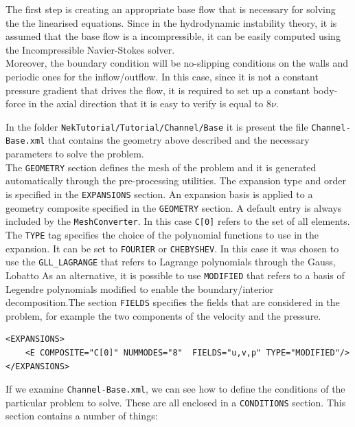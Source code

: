 \documentclass[a4paper,12pt]{article}
\begin{document}
The first step is creating an appropriate base flow that is necessary for solving the the linearised equations. Since in the hydrodynamic instability theory, it is assumed that the base flow is a incompressible, it can be easily computed using the Incompressible Navier-Stokes solver.\\ Moreover, the boundary condition will be no-slipping conditions on the walls and periodic ones for the inflow/outflow. In this case, since  it  is not a constant pressure gradient that drives the flow, it is required to set up a constant body-force in the axial direction that it is easy to verify is equal to $8\nu$. 

\vspace{5mm}

 In the folder \texttt{NekTutorial/Tutorial/Channel/Base}  it is present the file \texttt{Channel-Base.xml} that contains the geometry above described and the necessary parameters to solve the problem.\\
 The \texttt{GEOMETRY} section defines the mesh of the problem and it is generated automatically through the pre-processing utilities. The expansion type and order is specified in the \texttt{EXPANSIONS} section. An expansion basis is applied to a geometry composite specified in the \texttt{GEOMETRY} section. A default entry is always included by the \texttt{MeshConverter}. In this case \texttt{C[0]} refers to the set of all elements. The \texttt{TYPE} tag specifies the choice of the polynomial functions to use in the expansion. It can be set to \texttt{FOURIER} or \texttt{CHEBYSHEV}.  In this case it was chosen to use the \texttt{GLL\_LAGRANGE} that refers to Lagrange polynomials through the Gauss, Lobatto As an alternative, it is possible to use  \texttt{MODIFIED}  that refers to a basis of Legendre polynomials modified to enable the boundary/interior decomposition.The section \texttt{FIELDS} specifies the fields that are considered in the problem, for example the two components of the velocity and the pressure.

\begin{verbatim}
<EXPANSIONS>
    <E COMPOSITE="C[0]" NUMMODES="8"  FIELDS="u,v,p" TYPE="MODIFIED"/>
</EXPANSIONS>
\end{verbatim}

If we examine \texttt{Channel-Base.xml}, we can see how to define the
conditions of the particular problem to solve. These are all enclosed
in a \texttt{CONDITIONS} section. This section contains a number of things:
\end{document}

